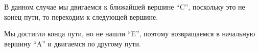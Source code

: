\begin{figure}[H]
\end{figure}

В данном случае мы двигаемся к ближайшей вершине ``C'', поскольку это не конец пути, то переходим к следующей вершине.

\begin{figure}[H]
\end{figure}

Мы достигли конца пути, но не нашли ``E'', поэтому возвращаемся в начальную вершину ``A'' и двигаемся по другому пути.

\begin{figure}[H]
\end{figure}

